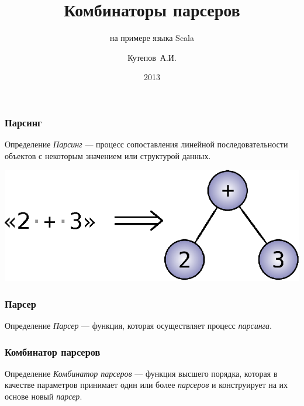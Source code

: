\documentclass{beamer}
\title{Комбинаторы парсеров}
\subtitle{на примере языка Scala}
\author{Кутепов~А.И.}
\date{2013}
\begin{document}
\begin{frame}
  \titlepage
\end{frame}

\begin{frame}
  \frametitle{Парсинг}
  \pause
  \begin{block}{Определение}
    \textit{Парсинг} --- процесс сопоставления линейной
    последовательности объектов с некоторым значением или структурой
    данных.
  \end{block}
  \pause
  \includegraphics{images/parsing-example.eps}
\end{frame}

\begin{frame}
  \frametitle{Парсер}
  \pause
  \begin{block}{Определение}
    \textit{Парсер} --- функция, которая осуществляет процесс
    \textit{парсинга}.
  \end{block}
\end{frame}

\begin{frame}
  \frametitle{Комбинатор парсеров}
  \pause
  \begin{block}{Определение}
    \textit{Комбинатор парсеров} --- функция высшего порядка, которая
    в качестве параметров принимает один или более \textit{парсеров} и
    конструирует на их основе новый \textit{парсер}.
  \end{block}
\end{frame}
\end{document}
